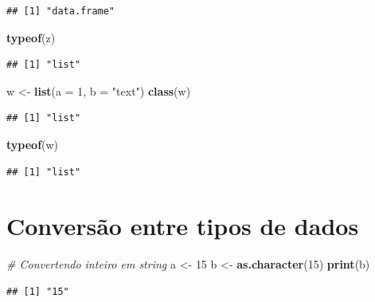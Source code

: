 \documentclass[
]{book}
\newenvironment{Shaded}{\begin{snugshade}}{\end{snugshade}}
\newcommand{\AttributeTok}[1]{\textcolor[rgb]{0.13,0.29,0.53}{#1}}
\newcommand{\CommentTok}[1]{\textcolor[rgb]{0.56,0.35,0.01}{\textit{#1}}}
\newcommand{\DecValTok}[1]{\textcolor[rgb]{0.00,0.00,0.81}{#1}}
\newcommand{\FunctionTok}[1]{\textcolor[rgb]{0.13,0.29,0.53}{\textbf{#1}}}
\newcommand{\NormalTok}[1]{#1}
\newcommand{\OtherTok}[1]{\textcolor[rgb]{0.56,0.35,0.01}{#1}}
\newcommand{\StringTok}[1]{\textcolor[rgb]{0.31,0.60,0.02}{#1}}
\theoremstyle{definition}
\theoremstyle{definition}
\theoremstyle{definition}
\theoremstyle{definition}
\theoremstyle{remark}
\begin{document}
\begin{verbatim}
## [1] "data.frame"
\end{verbatim}

\begin{Shaded}
\begin{Highlighting}[]
\FunctionTok{typeof}\NormalTok{(z) }
\end{Highlighting}
\end{Shaded}

\begin{verbatim}
## [1] "list"
\end{verbatim}

\begin{Shaded}
\begin{Highlighting}[]
\NormalTok{w }\OtherTok{\textless{}{-}} \FunctionTok{list}\NormalTok{(}\AttributeTok{a =} \DecValTok{1}\NormalTok{, }\AttributeTok{b =} \StringTok{"text"}\NormalTok{)}
\FunctionTok{class}\NormalTok{(w) }
\end{Highlighting}
\end{Shaded}

\begin{verbatim}
## [1] "list"
\end{verbatim}

\begin{Shaded}
\begin{Highlighting}[]
\FunctionTok{typeof}\NormalTok{(w) }
\end{Highlighting}
\end{Shaded}

\begin{verbatim}
## [1] "list"
\end{verbatim}

\section{Conversão entre tipos de dados}\label{conversuxe3o-entre-tipos-de-dados}

\begin{Shaded}
\begin{Highlighting}[]
\CommentTok{\# Convertendo inteiro em string }
\NormalTok{a }\OtherTok{\textless{}{-}} \DecValTok{15}
\NormalTok{b }\OtherTok{\textless{}{-}} \FunctionTok{as.character}\NormalTok{(}\DecValTok{15}\NormalTok{)}
\FunctionTok{print}\NormalTok{(b)}
\end{Highlighting}
\end{Shaded}

\begin{verbatim}
## [1] "15"
\end{verbatim}
\end{document}

